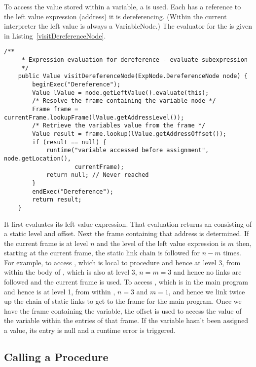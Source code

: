 \documentclass[a4paper,twoside]{article}
\begin{document}
To access the value stored within a variable, a  is used.
Each  has a reference to the left value expression (address) it is dereferencing.
(Within the current interpreter the left value is always a \textsf{VariableNode}.)
The evaluator for the  is given in Listing~\ref{visitDereferenceNode}.
\begin{figure*}[ht]
\begin{lstlisting}[caption=Evaluating a DereferenceNode,label=visitDereferenceNode]
    /**
     * Expression evaluation for dereference - evaluate subexpression
     */
    public Value visitDereferenceNode(ExpNode.DereferenceNode node) {
        beginExec("Dereference");
        Value lValue = node.getLeftValue().evaluate(this);
        /* Resolve the frame containing the variable node */
        Frame frame = currentFrame.lookupFrame(lValue.getAddressLevel());
        /* Retrieve the variables value from the frame */
        Value result = frame.lookup(lValue.getAddressOffset());
        if (result == null) {
            runtime("variable accessed before assignment", node.getLocation(),
                    currentFrame);
            return null; // Never reached
        }
        endExec("Dereference");
        return result;
    }
\end{lstlisting}
\end{figure*}
It first evaluates its left value expression. 
That evaluation returns an  consisting of a static level and offset.
Next the frame containing that address is determined.
If the current frame is at level $n$ and the level of the left value expression is $m$ 
then, starting at the current frame, the static link chain is followed for $n-m$ times.
For example, to access , which is local to procedure  and hence at level 3,
from within the body of , which is also at level 3, 
$n=m=3$ and hence no links are followed and the current frame is used.
To access , which is in the main program and hence is at level 1, 
from within , $n=3$ and $m=1$, and hence we link twice up the chain of static links
to get to the frame for the main program. 
Once we have the frame containing the variable, 
the offset is used to access the value of the variable within the entries of that frame.
If the variable hasn't been assigned a value, its entry is null and 
a runtime error is triggered.



\subsection{Calling a Procedure}\label{section:call}
\end{document}
